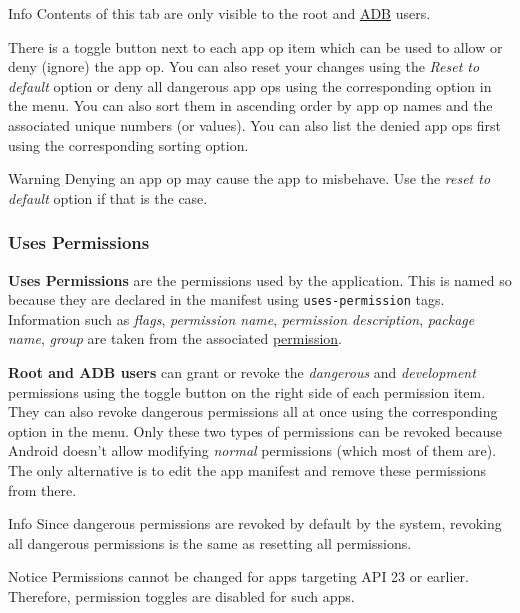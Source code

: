 \begin{tip}{Info}
    Contents of this tab are only visible to the root and \hyperref[sec:adb-over-tcp]{ADB} users.
\end{tip}

There is a toggle button next to each app op item which can be used to allow or deny (ignore) the app op. You can also
reset your changes using the \textit{Reset to default} option or deny all dangerous app ops using the corresponding
option in the menu. You can also sort them in ascending order by app op names and the associated unique numbers (or
values). You can also list the denied app ops first using the corresponding sorting option.

\begin{warning}{Warning}
    Denying an app op may cause the app to misbehave. Use the \textit{reset to default} option if that is the case.
\end{warning}


\subsubsection{Uses Permissions}
\textbf{Uses Permissions} are the permissions used by the application. This is named so because they are declared in the
manifest using \texttt{uses-permission} tags. Information such as \textit{flags}, \textit{permission name},
\textit{permission description}, \textit{package name}, \textit{group} are taken from the associated
\hyperref[subsubsec:permissions]{permission}.

\textbf{Root and ADB users} can grant or revoke the \textit{dangerous} and \textit{development} permissions using
the toggle button on the right side of each permission item. They can also revoke dangerous permissions all at once
using the corresponding option in the menu. Only these two types of permissions can be revoked because Android doesn't
allow modifying \textit{normal} permissions (which most of them are). The only alternative is to edit the app manifest
and remove these permissions from there.

\begin{tip}{Info}
    Since dangerous permissions are revoked by default by the system, revoking all dangerous permissions is the same as
    resetting all permissions.
\end{tip}

\begin{tip}{Notice}
    Permissions cannot be changed for apps targeting API 23 or earlier. Therefore, permission toggles are disabled for
    such apps.
\end{tip}

